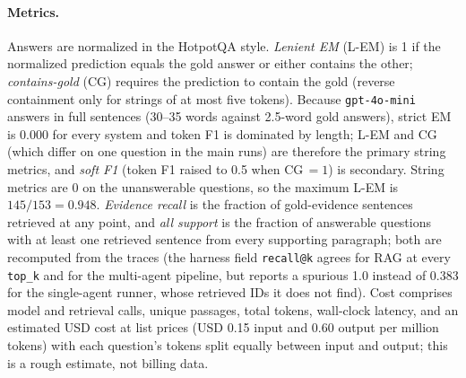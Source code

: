 \documentclass[11pt,a4paper]{article}
\newcommand{\lem}{L-EM}
\newcommand{\cg}{CG}
\begin{document}
\paragraph{Metrics.}
Answers are normalized in the HotpotQA style.
\emph{Lenient EM} (\lem{}) is 1 if the normalized prediction equals the gold
answer or either contains the other; \emph{contains-gold} (\cg{}) requires
the prediction to contain the gold (reverse containment only for strings of
at most five tokens).
Because \texttt{gpt-4o-mini} answers in full sentences (30--35 words against
2.5-word gold answers), strict EM is 0.000 for every system and token F1 is
dominated by length; \lem{} and \cg{} (which differ on one question in the
main runs) are therefore the primary string metrics, and \emph{soft F1}
(token F1 raised to 0.5 when \cg{}$\,=1$) is secondary.
String metrics are 0 on the unanswerable questions, so the maximum \lem{} is
$145/153 = 0.948$.
\emph{Evidence recall} is the fraction of gold-evidence sentences retrieved at
any point, and \emph{all support} is the fraction of answerable questions
with at least one retrieved sentence from every supporting paragraph; both are
recomputed from the traces (the harness field \texttt{recall@k} agrees for
RAG at every \texttt{top\_k} and for the multi-agent pipeline, but reports a
spurious 1.0 instead of 0.383 for the single-agent runner, whose retrieved
IDs it does not find).
Cost comprises model and retrieval calls, unique passages, total tokens,
wall-clock latency, and an estimated USD cost at list prices (USD 0.15 input
and 0.60 output per million tokens) with each question's tokens split equally
between input and output; this is a rough estimate, not billing data.
\end{document}
